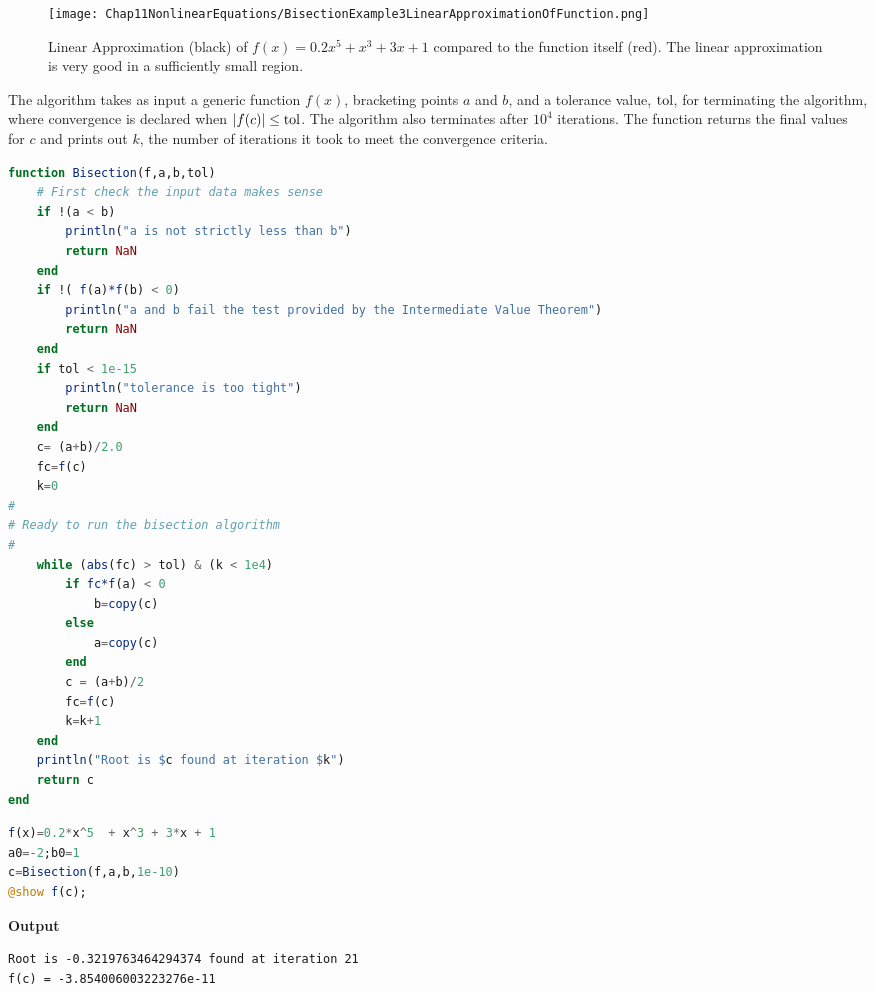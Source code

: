 \begin{figure}[hbt!]
    \centering
    \texttt{[image: Chap11NonlinearEquations/BisectionExample3LinearApproximationOfFunction.png]}
    \caption[]{Linear Approximation (black) of $f(x)=0.2x^5  + x^3 + 3x + 1$ compared to the function itself (red). The linear approximation is very good in a sufficiently small region. 
    }
    \label{fig:LinearApproximationInspriedBisection}
    \end{figure}



\begin{tcolorbox}[title=\textbf{\large Bisection Algorithm with Sanity Checks and Tolerance Included}]
The algorithm takes as input a generic function $f(x)$, bracketing points $a$ and $b$, and a tolerance value, ${\rm tol}$, for terminating the algorithm, where convergence is declared when $|f(c)| \le {\rm tol}$. The algorithm also terminates after $10^4$ iterations. 
The function returns the final values for $c$ and prints out $k$, the number of iterations it took to meet the convergence criteria.
    \begin{lstlisting}[language=Julia,style=mystyle]
function Bisection(f,a,b,tol)
    # First check the input data makes sense
    if !(a < b)
        println("a is not strictly less than b")
        return NaN
    end
    if !( f(a)*f(b) < 0)
        println("a and b fail the test provided by the Intermediate Value Theorem")
        return NaN
    end
    if tol < 1e-15
        println("tolerance is too tight")
        return NaN
    end
    c= (a+b)/2.0
    fc=f(c)
    k=0
#
# Ready to run the bisection algorithm 
# 
    while (abs(fc) > tol) & (k < 1e4) 
        if fc*f(a) < 0
            b=copy(c)
        else
            a=copy(c)
        end    
        c = (a+b)/2
        fc=f(c)
        k=k+1
    end
    println("Root is $c found at iteration $k")
    return c  
end
\end{lstlisting}
\end{tcolorbox}

\begin{lstlisting}[language=Julia,style=mystyle]
f(x)=0.2*x^5  + x^3 + 3*x + 1
a0=-2;b0=1
c=Bisection(f,a,b,1e-10)
@show f(c);
\end{lstlisting}
\textbf{Output}
\begin{verbatim}
Root is -0.3219763464294374 found at iteration 21
f(c) = -3.854006003223276e-11  
\end{verbatim}





